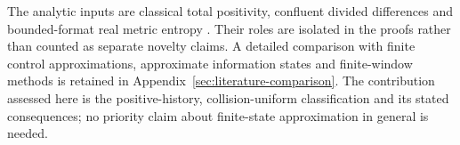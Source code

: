 The analytic inputs are classical total positivity, confluent divided
differences and bounded-format real metric entropy
\cite{Pinkus,deBoor,YomdinComte,ZhangKileel,ComteHalupczok}.
Their roles are isolated in the proofs rather than counted as separate
novelty claims. A detailed comparison with finite control approximations,
approximate information states and finite-window methods is retained in
Appendix~\ref{sec:literature-comparison}. The contribution assessed here
is the positive-history, collision-uniform classification and its stated
consequences; no priority claim about finite-state approximation in
general is needed.
